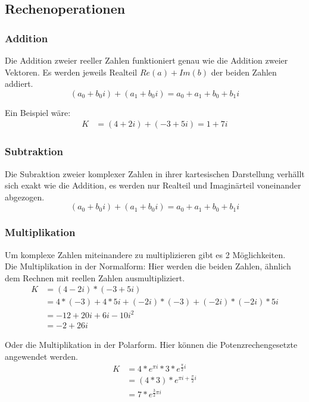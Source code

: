 \documentclass[a4paper, 12pt]{article}
\begin{document}
\subsection{Rechenoperationen}
\subsubsection{Addition}
Die Addition zweier reeller Zahlen funktioniert genau wie die Addition zweier Vektoren. Es werden jeweils Realteil $Re(a) + Im(b)$ der beiden Zahlen addiert. \cite{book_alt}
\[ (a_0 + b_0 i) + (a_1 + b_0 i) = a_0 + a_1 + b_0 + b_1 i \]

Ein Beispiel wäre:
\begin{equation} \label{add_ex1}
  \begin{split}
        K & = (4 + 2i) + (-3  + 5i) = 1 + 7i
  \end{split}
\end{equation}


\subsubsection{Subtraktion}
Die Subraktion zweier komplexer Zahlen in ihrer kartesischen Darstellung verhällt sich exakt wie die Addition, es werden nur Realteil und Imaginärteil voneinander abgezogen.
\[ (a_0 + b_0 i) + (a_1 + b_0 i) = a_0 + a_1 + b_0 + b_1 i \]




\subsubsection{Multiplikation}
Um komplexe Zahlen miteinandere zu multiplizieren gibt es 2 Möglichkeiten. \\
Die Multiplikation in der Normalform:
Hier werden die beiden Zahlen, ähnlich dem Rechnen mit reellen Zahlen ausmultipliziert.
\begin{equation} \label{mul_ex1}
  \begin{split}
        K & = (4 - 2i) * (-3  + 5i) \\
        & = 4 * (-3) + 4 * 5i + (-2i) * (-3) + (-2i) * (-2i) * 5i \\
        & = -12 + 20i + 6i - 10i^2 \\
        & = -2 + 26i
  \end{split}
\end{equation}

Oder die Multiplikation in der Polarform. Hier können die Potenzrechengesetzte angewendet werden.
\begin{equation} \label{mul_ex2}
  \begin{split}
    K & = 4 * e^{\pi i} * 3 * e^{\frac{\pi}{2}i} \\
    & = (4 * 3) * e^{\pi i + {\frac{\pi}{2}i}}\\
    & = 7 * e^{\frac{3}{2} \pi i}\\
  \end{split}
\end{equation}
\end{document}
